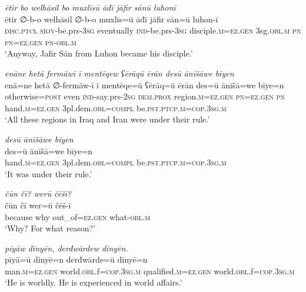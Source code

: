\ea \label{ŠJ.97}
\textit{ētir bo welhāsil bo muxlīsū āđī jāfir sānū luhonī} \\ 
\gll ētir ∅-b-o welhāsil ∅-b-o muxlīs=ū āđī jāfir sān=ū luhon-ī \\ 
 \textsc{disc.ptcl} \textsc{sbjv-}be.prs\textsc{-3sg} eventually \textsc{ind-}be.prs\textsc{-3sg} disciple\textsc{.m}\textsc{=ez.gen} 3sg\textsc{.obl}\textsc{.m} \textsc{pn} \textsc{pn}\textsc{=ez.gen} \textsc{pn}\textsc{-obl}\textsc{.m} \\ 
\glt `Anyway, Jafir Sān from Luhon became his disciple.'
\z 
 
\ea \label{ŠJ.102}
\textit{enāne hetā fermāwī ī mentēqew ʕērāqū ērān desū ānīšāwe bīyen} \\ 
\gll enā=ne hetā ∅-fermāw-ī ī mentēqe=ū ʕērāq=ū ērān des=ū ānīšā=we bīye=n \\ 
 otherwise\textsc{=\textsc{post}} even \textsc{ind-}say.prs-\textsc{2sg} \textsc{dem.prox} region\textsc{.m}\textsc{=ez.gen} \textsc{pn}\textsc{=ez.gen} \textsc{pn} hand\textsc{.m}\textsc{=ez.gen} 3pl.dem\textsc{.obl}\textsc{=compl} be\textsc{.pst}\textsc{.ptcp}\textsc{.m}\textsc{=cop}\textsc{.3sg}\textsc{.m} \\ 
\glt `All these regions in Iraq and Iran were under their rule.'
\z 
 
\ea \label{ŠJ.103}
\textit{desū ānīšāwe bīyen} \\ 
\gll des=ū ānīšā=we bīye=n \\ 
 hand\textsc{.m}\textsc{=ez.gen} 3pl.dem\textsc{.obl}\textsc{=compl} be\textsc{.pst}\textsc{.ptcp}\textsc{.m}\textsc{=cop}\textsc{.3sg}\textsc{.m} \\ 
\glt `It was under their rule.'
\z 
 
\ea \label{ŠJ.106}
\textit{čūn čī? werū čēšī?} \\ 
\gll čūn čī wer=ū čēš-ī \\ 
 because why out\_of\textsc{=ez.gen} what\textsc{-obl}\textsc{.m} \\ 
\glt `Why? For what reason?'
\z 
 
\ea \label{ŠJ.107}
\textit{pīyāw dinyēn, derđwārdew dinyēn.} \\ 
\gll pīyā=ū dinyē=n derđwārde=ū dinyē=n \\ 
 man\textsc{.m}\textsc{=ez.gen} world\textsc{.obl}.f\textsc{=cop}\textsc{.3sg}\textsc{.m} qualified\textsc{.m}\textsc{=ez.gen} world\textsc{.obl}.f\textsc{=cop}\textsc{.3sg}\textsc{.m} \\ 
\glt `He is worldly. He is experienced in world affairs.'
\z 
 
